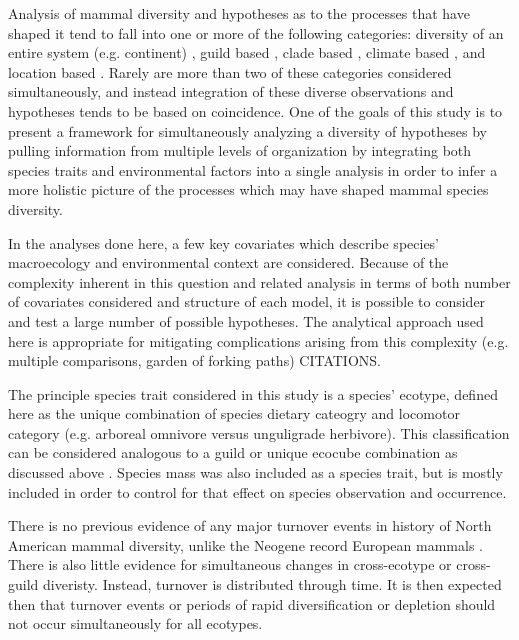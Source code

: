 \documentclass[12pt,letterpaper]{article}
\begin{document}
Analysis of mammal diversity and hypotheses as to the processes that have shaped it tend to fall into one or more of the following categories: diversity of an entire system (e.g. continent) \citep{Alroy2000g,Alroy1996a,Figueirido2012,Liow2008}, guild based \citep{Janis2004,Janis2000,Jernvall2004,Janis1993c,Pires2015a,Janis2008a}, clade based \citep{Quental2013,Slater2015c,Silvestro2015b}, climate based \citep{Blois2009,Janis1993c,Janis1993b}, and location based \citep{Eronen2015,Badgley2013}. Rarely are more than two of these categories considered simultaneously, and instead integration of these diverse observations and hypotheses tends to be based on coincidence. One of the goals of this study is to present a framework for simultaneously analyzing a diversity of hypotheses by pulling  information from multiple levels of organization by integrating both species traits and environmental factors into a single analysis in order to infer a more holistic picture of the processes which may have shaped mammal species diversity.

In the analyses done here, a few key covariates which describe species' macroecology and environmental context are considered. Because of the complexity inherent in this question and related analysis in terms of both number of covariates considered and structure of each model, it is possible to consider and test a large number of possible hypotheses. The analytical approach used here is appropriate for mitigating complications arising from this complexity (e.g. multiple comparisons, garden of forking paths) CITATIONS.

The principle species trait considered in this study is a species' ecotype, defined here as the unique combination of species dietary cateogry and locomotor category (e.g. arboreal omnivore versus unguligrade herbivore). This classification can be considered analogous to a guild or unique ecocube combination as discussed above \citep{Bush2007,Bambach2008,Bush2011}. Species mass was also included as a species trait, but is mostly included in order to control for that effect on species observation and occurrence.

There is no previous evidence of any major turnover events in history of North American mammal diversity, unlike the Neogene record European mammals \citep{Alroy2009,Alroy1996a,Eronen2015,Janis1993b,Alroy2000g}. There is also little evidence for simultaneous changes in cross-ecotype or cross-guild diveristy. Instead, turnover is distributed through time. It is then expected then that turnover events or periods of rapid diversification or depletion should not occur simultaneously for all ecotypes.
\end{document}

